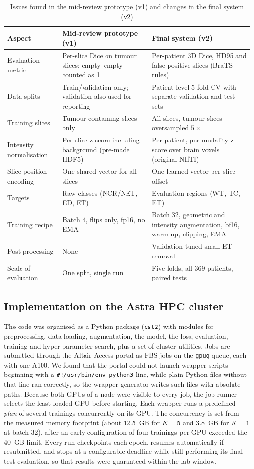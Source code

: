 \begin{table}[htbp]\centering\small
\caption{Issues found in the mid-review prototype (v1) and changes in the final system (v2)}\label{tab:evolution}
\begin{tabular}{p{4.6cm}p{4.6cm}p{4.6cm}}\toprule
\textbf{Aspect} & \textbf{Mid-review prototype (v1)} & \textbf{Final system (v2)}\\\midrule
Evaluation metric & Per-slice Dice on tumour slices; empty--empty counted as 1 & Per-patient 3D Dice, HD95 and false-positive slices (BraTS rules)\\
Data splits & Train/validation only; validation also used for reporting & Patient-level 5-fold CV with separate validation and test sets\\
Training slices & Tumour-containing slices only & All slices, tumour slices oversampled $5\times$\\
Intensity normalisation & Per-slice z-score including background (pre-made HDF5) & Per-patient, per-modality z-score over brain voxels (original NIfTI)\\
Slice position encoding & One shared vector for all slices & One learned vector per slice offset\\
Targets & Raw classes (NCR/NET, ED, ET) & Evaluation regions (WT, TC, ET)\\
Training recipe & Batch 4, flips only, fp16, no EMA & Batch 32, geometric and intensity augmentation, bf16, warm-up, clipping, EMA\\
Post-processing & None & Validation-tuned small-ET removal\\
Scale of evaluation & One split, single run & Five folds, all 369 patients, paired tests\\\bottomrule
\end{tabular}
\end{table}

\subsection{Implementation on the Astra HPC cluster}
The code was organised as a Python package (\texttt{cst2}) with modules for preprocessing, data loading, augmentation, the model, the loss, evaluation, training and hyper-parameter search, plus a set of cluster utilities. Jobs are submitted through the Altair Access portal as PBS jobs on the \texttt{gpuq} queue, each with one A100. We found that the portal could not launch wrapper scripts beginning with a \texttt{\#!/usr/bin/env python3} line, while plain Python files without that line ran correctly, so the wrapper generator writes such files with absolute paths. Because both GPUs of a node were visible to every job, the job runner selects the least-loaded GPU before starting. Each wrapper runs a predefined \emph{plan} of several trainings concurrently on its GPU. The concurrency is set from the measured memory footprint (about 12.5~GB for $K=5$ and 3.8~GB for $K=1$ at batch 32), after an early configuration of four trainings per GPU exceeded the 40~GB limit. Every run checkpoints each epoch, resumes automatically if resubmitted, and stops at a configurable deadline while still performing its final test evaluation, so that results were guaranteed within the lab window.
